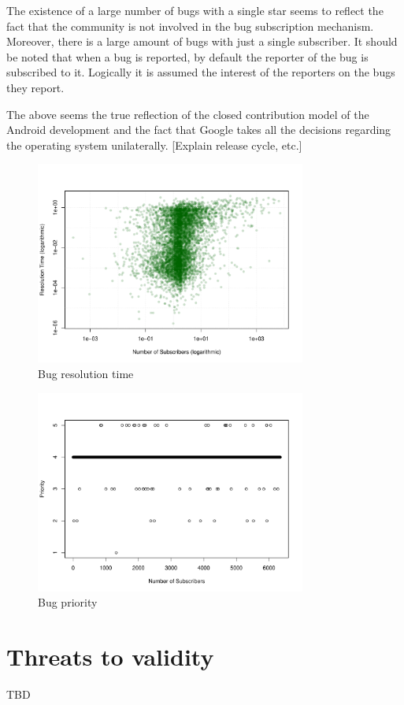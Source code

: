 \documentclass[10pt, conference, compsocconf]{IEEEtran}
\begin{document}
The existence of a large number of bugs with a single star seems to reflect the fact that the community is not involved in the bug subscription mechanism. Moreover, there is a large amount of bugs with just a single subscriber. It should be noted that when a bug is reported, by default the reporter of the bug is subscribed to it. Logically it is assumed the interest of the reporters on the bugs they report. 

The above seems the true reflection of the closed contribution model of the Android development and the fact that Google takes all the decisions regarding the operating system unilaterally. [Explain release cycle, etc.]

\begin{figure}[!t]
\centering
\includegraphics[width=3.5in]{stars-duration-log}
\caption{Bug resolution time}
\label{fig:stars-duration}
\end{figure}

\begin{figure}[!t]
\centering
\includegraphics[width=3.5in]{stars-priority}
\caption{Bug priority}
\label{fig:stars-priority}
\end{figure}

\section{Threats to validity}
TBD
\end{document}

